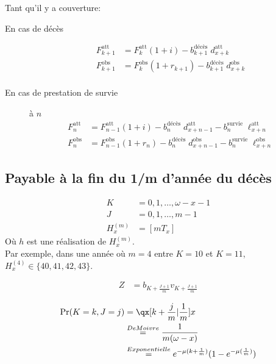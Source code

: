 \documentclass[10pt, french]{article}
\begin{document}
\begin{multicols*}{3}
Tant qu'il y a couverture:
\begin{description}

\item[En cas de décès]
	\begin{align*}
		F_{k + 1}^{\text{att}} &= F_{k}^{\text{att}}(1 + i) - b_{k + 1}^{\text{décès}} \; d_{x + k}^{\text{att}} \\
		F_{k + 1}^{\text{obs}} &= F_{k}^{\text{obs}}(1 + r_{k + 1}) - b_{k + 1}^{\text{décès}} \; d_{x + k}^{\text{obs}} \\
	\end{align*}
\item[En cas de prestation de survie] à $n$
	\begin{align*}
		F_{n}^{\text{att}} &= F_{n - 1}^{\text{att}}(1 + i) - b_{n}^{\text{décès}} \; d_{x + n - 1}^{\text{att}} - b_{n}^{\text{survie}} \; \ell_{x + n}^{\text{att}} \\
		F_{n}^{\text{obs}} &= F_{n - 1}^{\text{obs}}(1 + r_{n}) - b_{n}^{\text{décès}} \; d_{x + n - 1}^{\text{obs}} - b_{n}^{\text{survie}} \; \ell_{x + n}^{\text{obs}}
	\end{align*}
\end{description}

\subsection{Payable à la fin du 1/m d'année du décès}


\begin{align*}
	K &= 0, 1, \dots, \omega - x - 1 \\
	J &= 0, 1, \dots, m - 1 \\
	H^{(m)}_x &= [m T_x]
\end{align*}
Où $h$ est une réalisation de $H^{(m)}_x$. \\
Par exemple, dans une année où $m = 4$ entre $K = 10$ et $K = 11$, $H^{(4)}_x \in \{40, 41, 42, 43\}$.

\begin{align*}
	Z 		&= b_{K + \frac{J + 1}{m}} v_{K + \frac{J + 1}{m}} 
\end{align*}

\begin{align*}
	\text{Pr}(K = k, J = j) 
	&= \qx[k + \frac{j}{m} | \frac{1}{m}]{x} \\
	&\stackrel{De Moivre}= \frac{1}{m(\omega - x)} \\
	&\stackrel{Exponentielle}= e^{-\mu(k + \frac{1}{m})}(1 - e^{-\mu(\frac{1}{m})})
\end{align*}


\end{multicols*}
\end{document}
